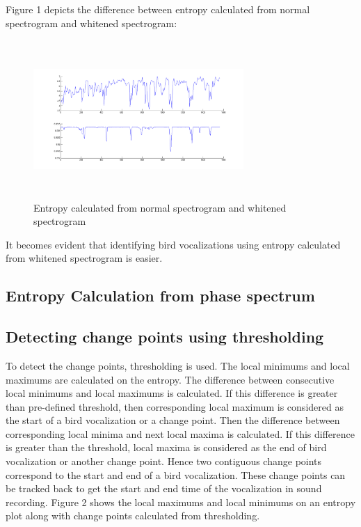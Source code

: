 \documentclass[a4paper]{article}
\begin{document}
Figure 1 depicts the difference between entropy calculated from normal spectrogram and whitened spectrogram:
\begin{figure}[!ht]
	\centering
	\includegraphics[width=8cm, height=6cm]{entropy}
	\caption{ Entropy calculated from normal spectrogram and whitened spectrogram}   
\end{figure}

It becomes evident that identifying bird vocalizations using entropy calculated from whitened spectrogram is easier.  



\subsection{Entropy Calculation from phase spectrum}



\subsection{Detecting change points using thresholding}

To detect the change points, thresholding is used. The local minimums and local maximums are calculated on the  entropy. The difference between consecutive local minimums and local maximums is calculated. If this difference is greater than pre-defined threshold, then corresponding local maximum is considered as the start of a bird vocalization or a change point. Then the difference between corresponding local minima and next local maxima is calculated. If this difference is greater than the threshold, local maxima is considered as the end of bird vocalization or another change point. Hence two contiguous change points correspond to the start and end of a bird vocalization. These change points can be tracked back to get the start and end time of the vocalization in sound recording. Figure 2 shows the local maximums and local minimums on an entropy plot along with change points calculated from thresholding.
\end{document}
